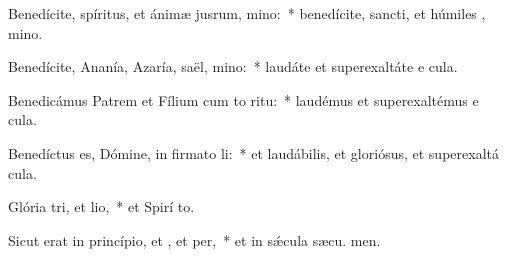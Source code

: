 \item Benedícite, spíritus, et ánimæ jusrum, mino:~* benedícite, sancti, et húmiles , mino.
\item Benedícite, Ananía, Azaría, saël, mino:~* laudáte et superexaltáte e  cula.
\item Benedicámus Patrem et Fílium cum to ritu:~* laudémus et superexaltémus e  cula.
\item Benedíctus es, Dómine, in firmato li:~* et laudábilis, et gloriósus, et superexaltá  cula.
\item Glória tri, et lio,~* et Spirí to.
\item Sicut erat in princípio, et , et per,~* et in sǽcula sæcu. men.
